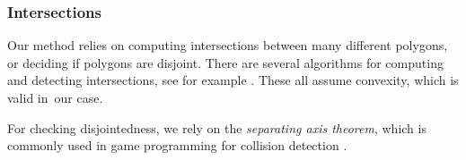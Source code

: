 
\subsubsection{Intersections} \label{sec:intersections}

Our method relies on computing intersections between many different polygons, or deciding if polygons are
disjoint. There are several algorithms for computing and detecting intersections, see for example
\cite{Toussaint1985sla, Rourke1982nla, Chazelle1980dec}.  These all assume convexity, which is valid in\
our case.

For checking disjointedness, we rely on the {\em separating axis theorem}, which is commonly used in game
programming for collision detection \cite{Gottschalk1996sat}.

